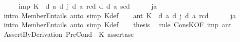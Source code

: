 \begin{isabellebody}
\ {\isacharminus}{\kern0pt}\isanewline
\ \ \isamarkupfalse%
\ imp{\isacharcolon}{\kern0pt}\ {\isachardoublequoteopen}{\isasymGamma}\isactrlsub K\ {\isasymTurnstile}\ {\isasymD}\isactrlsup d\ a\ {\isacharparenleft}{\kern0pt}{\isasymB}\isactrlsup d\ j\ {\isacharparenleft}{\kern0pt}{\isasymB}\isactrlsup d\ a\ {\isacharbraceleft}{\kern0pt}r\isactrlsup c{\isacharbraceright}{\kern0pt}\isactrlsup d\ {\isasymsupset}\isactrlsup d\ {\isasymB}\isactrlsup d\ a\ {\isacharbraceleft}{\kern0pt}s\isactrlsup c{\isacharbraceright}{\kern0pt}\isactrlsup d{\isacharparenright}{\kern0pt}{\isacharparenright}{\kern0pt}{\isachardoublequoteclose}\isanewline
\ \ \ \ \isamarkupfalse%
\ ja\ \isamarkupfalse%
\ {\isacharparenleft}{\kern0pt}intro\ MemberEntails{\isacharparenright}{\kern0pt}\ {\isacharparenleft}{\kern0pt}auto\ simp{\isacharcolon}{\kern0pt}\ {\isasymGamma}\isactrlsub K{\isacharunderscore}{\kern0pt}def{\isacharparenright}{\kern0pt}\isanewline
\ \ \isamarkupfalse%
\ ant{\isacharcolon}{\kern0pt}\ {\isachardoublequoteopen}{\isasymGamma}\isactrlsub K\ {\isasymTurnstile}\ {\isasymD}\isactrlsup d\ a\ {\isacharparenleft}{\kern0pt}{\isasymB}\isactrlsup d\ j\ {\isacharparenleft}{\kern0pt}{\isasymB}\isactrlsup d\ a\ {\isacharbraceleft}{\kern0pt}r\isactrlsup c{\isacharbraceright}{\kern0pt}\isactrlsup d{\isacharparenright}{\kern0pt}{\isacharparenright}{\kern0pt}{\isachardoublequoteclose}\isanewline
\ \ \ \ \isamarkupfalse%
\ ja\ \isamarkupfalse%
\ {\isacharparenleft}{\kern0pt}intro\ MemberEntails{\isacharparenright}{\kern0pt}\ {\isacharparenleft}{\kern0pt}auto\ simp{\isacharcolon}{\kern0pt}\ {\isasymGamma}\isactrlsub K{\isacharunderscore}{\kern0pt}def{\isacharparenright}{\kern0pt}\isanewline
\ \ \isamarkupfalse%
\ {\isacharquery}{\kern0pt}thesis\ \isamarkupfalse%
\ {\isacharparenleft}{\kern0pt}rule\ ConsK{\isasymD}{\isasymB}{\isacharbrackleft}{\kern0pt}OF\ imp\ ant{\isacharbrackright}{\kern0pt}{\isacharparenright}{\kern0pt}\isanewline
{}\isamarkupfalse%
%
\endisatagproof
{\isafoldproof}%
%
\isadelimproof
\isanewline
%
\endisadelimproof
\isanewline
{}\isamarkupfalse%
\ AssertByDerivation{\isacharcolon}{\kern0pt}\ {\isachardoublequoteopen}PreCond\ {\isacharbrackleft}{\kern0pt}{\isacharbrackright}{\kern0pt}\ {\isasymGamma}\isactrlsub K\ assert{\isacharbrackleft}{\kern0pt}a{\isacharcomma}{\kern0pt}s\isactrlsup c{\isacharbrackright}{\kern0pt}{\isachardoublequoteclose}\isanewline
%
\isadelimproof
\ \ %

\end{isabellebody}
